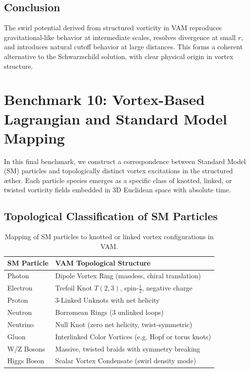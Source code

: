 \documentclass[preprint]{revtex4-2}
\begin{document}
\subsection{Conclusion}

The swirl potential derived from structured vorticity in VAM reproduces gravitational-like behavior at intermediate scales, resolves divergence at small \( r \), and introduces natural cutoff behavior at large distances. This forms a coherent alternative to the Schwarzschild solution, with clear physical origin in vortex structure.

\section{Benchmark 10: Vortex-Based Lagrangian and Standard Model Mapping}

In this final benchmark, we construct a correspondence between Standard Model (SM) particles and topologically distinct vortex excitations in the structured æther. Each particle species emerges as a specific class of knotted, linked, or twisted vorticity fields embedded in 3D Euclidean space with absolute time.

\subsection{Topological Classification of SM Particles}

\begin{table}[H]
\centering
\begin{tabular}{|l|l|}
\hline
\textbf{SM Particle} & \textbf{VAM Topological Structure} \\
\hline
Photon & Dipole Vortex Ring (massless, chiral translation) \\
Electron & Trefoil Knot \( T(2,3) \), spin-\( \frac{1}{2} \), negative charge \\
Proton & 3-Linked Unknots with net helicity \\
Neutron & Borromean Rings (3 unlinked loops) \\
Neutrino & Null Knot (zero net helicity, twist-symmetric) \\
Gluon & Interlinked Color Vortices (e.g. Hopf or torus knots) \\
W/Z Bosons & Massive, twisted braids with symmetry breaking \\
Higgs Boson & Scalar Vortex Condensate (swirl density mode) \\
\hline
\end{tabular}
\caption{Mapping of SM particles to knotted or linked vortex configurations in VAM.}
\end{table}
\end{document}
